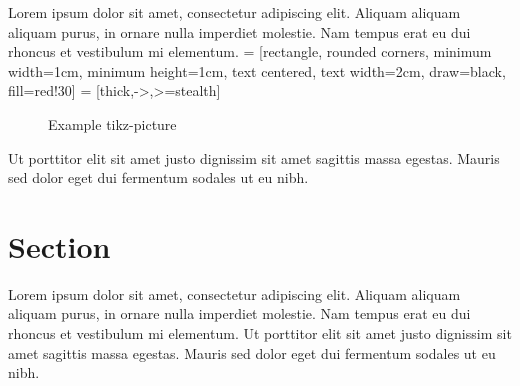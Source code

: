 \documentclass[11pt,a4paper,oneside,article]{memoir}
\begin{document}
Lorem ipsum dolor sit amet, consectetur adipiscing elit. Aliquam aliquam aliquam purus, in ornare nulla imperdiet molestie. Nam tempus erat eu dui rhoncus et vestibulum mi elementum. 
 = [rectangle, rounded corners, minimum width=1cm, minimum height=1cm, text centered, text width=2cm, draw=black, fill=red!30]
 = [thick,->,>=stealth]
\begin{figure}[htbp]
\centering
{}
\caption{Example tikz-picture}
\label{fig:tikz}
\end{figure}
Ut porttitor elit sit amet justo dignissim sit amet sagittis massa egestas. Mauris sed dolor eget dui fermentum sodales ut eu nibh. 

\section{Section}

Lorem ipsum dolor sit amet, consectetur adipiscing elit. Aliquam aliquam aliquam purus, in ornare nulla imperdiet molestie. Nam tempus erat eu dui rhoncus et vestibulum mi elementum. Ut porttitor elit sit amet justo dignissim sit amet sagittis massa egestas. Mauris sed dolor eget dui fermentum sodales ut eu nibh. 


\begin{flushleft}
\begin{singlespacing}

\end{singlespacing}
\end{flushleft}

\label{LastPage}~
\end{document}
